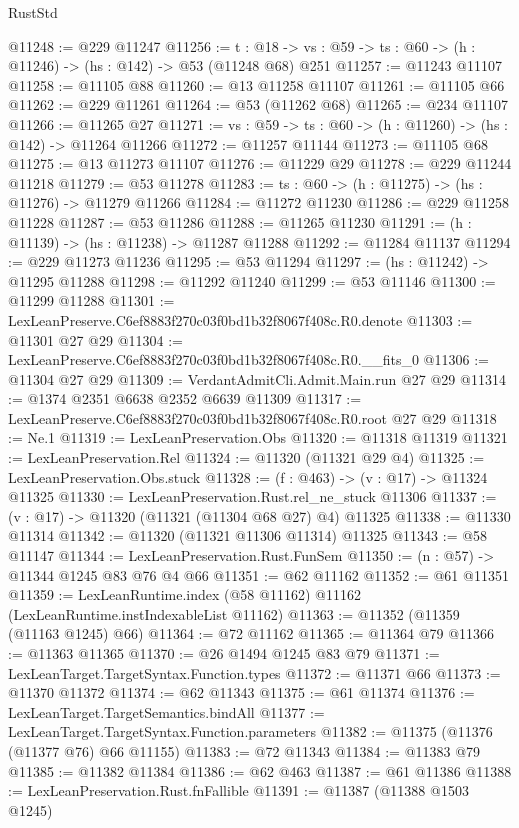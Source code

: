 \begin{lexlean}{RustStd}
\begin{coremodule}
@11248 := @229 @11247
@11256 := {t : @18} ->
  {vs : @59} -> {ts : @60} -> (h : @11246) -> (hs : @142) -> @53 (@11248 @68) @251
@11257 := @11243 @11107
@11258 := @11105 @88
@11260 := @13 @11258 @11107
@11261 := @11105 @66
@11262 := @229 @11261
@11264 := @53 (@11262 @68)
@11265 := @234 @11107
@11266 := @11265 @27
@11271 := {vs : @59} -> {ts : @60} -> (h : @11260) -> (hs : @142) -> @11264 @11266
@11272 := @11257 @11144
@11273 := @11105 @68
@11275 := @13 @11273 @11107
@11276 := @11229 @29
@11278 := @229 @11244 @11218
@11279 := @53 @11278
@11283 := {ts : @60} -> (h : @11275) -> (hs : @11276) -> @11279 @11266
@11284 := @11272 @11230
@11286 := @229 @11258 @11228
@11287 := @53 @11286
@11288 := @11265 @11230
@11291 := (h : @11139) -> (hs : @11238) -> @11287 @11288
@11292 := @11284 @11137
@11294 := @229 @11273 @11236
@11295 := @53 @11294
@11297 := (hs : @11242) -> @11295 @11288
@11298 := @11292 @11240
@11299 := @53 @11146
@11300 := @11299 @11288
@11301 := LexLeanPreserve.C6ef8883f270c03f0bd1b32f8067f408c.R0.denote
@11303 := @11301 @27 @29
@11304 := LexLeanPreserve.C6ef8883f270c03f0bd1b32f8067f408c.R0.__fits_0
@11306 := @11304 @27 @29
@11309 := VerdantAdmitCli.Admit.Main.run @27 @29
@11314 := @1374 @2351 @6638 @2352 @6639 @11309
@11317 := LexLeanPreserve.C6ef8883f270c03f0bd1b32f8067f408c.R0.root @27 @29
@11318 := Ne.{1}
@11319 := LexLeanPreservation.Obs
@11320 := @11318 @11319
@11321 := LexLeanPreservation.Rel
@11324 := @11320 (@11321 @29 @4)
@11325 := LexLeanPreservation.Obs.stuck
@11328 := (f : @463) -> (v : @17) -> @11324 @11325
@11330 := LexLeanPreservation.Rust.rel_ne_stuck @11306
@11337 := (v : @17) -> @11320 (@11321 (@11304 @68 @27) @4) @11325
@11338 := @11330 @11314
@11342 := @11320 (@11321 @11306 @11314) @11325
@11343 := @58 @11147
@11344 := LexLeanPreservation.Rust.FunSem
@11350 := (n : @57) -> @11344 @1245 @83 @76 @4 @66
@11351 := @62 @11162
@11352 := @61 @11351
@11359 := LexLeanRuntime.index (@58 @11162) @11162 (LexLeanRuntime.instIndexableList @11162)
@11363 := @11352 (@11359 (@11163 @1245) @66)
@11364 := @72 @11162
@11365 := @11364 @79
@11366 := @11363 @11365
@11370 := @26 @1494 @1245 @83 @79
@11371 := LexLeanTarget.TargetSyntax.Function.types
@11372 := @11371 @66
@11373 := @11370 @11372
@11374 := @62 @11343
@11375 := @61 @11374
@11376 := LexLeanTarget.TargetSemantics.bindAll
@11377 := LexLeanTarget.TargetSyntax.Function.parameters
@11382 := @11375 (@11376 (@11377 @76) @66 @11155)
@11383 := @72 @11343
@11384 := @11383 @79
@11385 := @11382 @11384
@11386 := @62 @463
@11387 := @61 @11386
@11388 := LexLeanPreservation.Rust.fnFallible
@11391 := @11387 (@11388 @1503 @1245)

\end{coremodule}
\end{lexlean}
